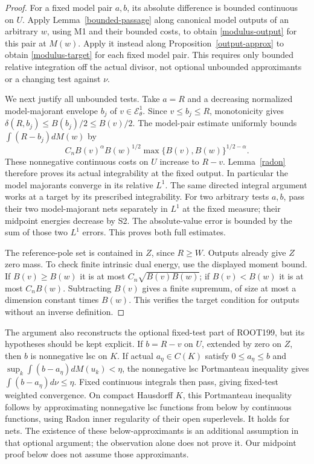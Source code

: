 \documentclass[10pt]{article}
\newcommand{\E}{\mathcal E}
\begin{document}
\begin{proof}
For a fixed model pair $a,b$, its absolute difference is bounded
continuous on $U$. Apply Lemma~\ref{bounded-passage} along canonical
model outputs of an arbitrary $w$, using M1 and their bounded costs,
to obtain \eqref{modulus-output} for this pair at $M(w)$.
Apply it instead along Proposition~\ref{output-approx} to obtain
\eqref{modulus-target} for each fixed model pair. This requires only
bounded relative integration off the actual divisor, not optional
unbounded approximants or a changing test against $\nu$.

We next justify all unbounded tests. Take $a=R$ and a decreasing
normalized model-majorant envelope $b_j$ of $v\in\E^1_\theta$.
Since $v\leq b_j\leq R$, monotonicity gives
$\delta(R,b_j)\leq B(b_j)/2\leq B(v)/2$.
The model-pair estimate uniformly bounds $\int(R-b_j)dM(w)$ by
\[
 C_n B(v)^\alpha B(w)^{1/2}\max\{B(v),B(w)\}^{1/2-\alpha}.
\]
These nonnegative continuous costs on $U$ increase to $R-v$.
Lemma~\ref{radon} therefore proves its actual integrability at the
fixed output. In particular the model majorants converge in its
relative $L^1$. The same directed integral argument works at a
target by its prescribed integrability.
For two arbitrary tests $a,b$, pass their two model-majorant nets
separately in $L^1$ at the fixed measure; their midpoint energies
decrease by S2. The absolute-value error is bounded by the sum of
those two $L^1$ errors. This proves both full estimates.

The reference-pole set is contained in $Z$, since $R\geq W$.
Outputs already give $Z$ zero mass. To check finite intrinsic dual
energy, use the displayed moment bound. If $B(v)\geq B(w)$ it is at
most $C_n\sqrt{B(v)B(w)}$; if $B(v)<B(w)$ it is at most $C_nB(w)$.
Subtracting $B(v)$ gives a finite supremum, of size at most a
dimension constant times $B(w)$. This verifies the target condition
for outputs without an inverse definition.
\end{proof}

The argument also reconstructs the optional fixed-test part of ROOT199,
but its hypotheses should be kept explicit. If $b=R-v$ on $U$, extended
by zero on $Z$, then $b$ is nonnegative lsc on $K$.
If actual $a_\eta\in C(K)$ satisfy $0\leq a_\eta\leq b$ and
$\sup_k\int(b-a_\eta)dM(u_k)<\eta$, the nonnegative lsc Portmanteau
inequality gives $\int(b-a_\eta)d\nu\leq\eta$.
Fixed continuous integrals then pass, giving fixed-test weighted convergence.
On compact Hausdorff $K$, this Portmanteau inequality follows by approximating
nonnegative lsc functions from below by continuous functions, using Radon
inner regularity of their open superlevels. It holds for nets.
The existence of these below-approximants is an additional assumption in
that optional argument; the observation alone does not prove it.
Our midpoint proof below does not assume those approximants.
\end{document}
